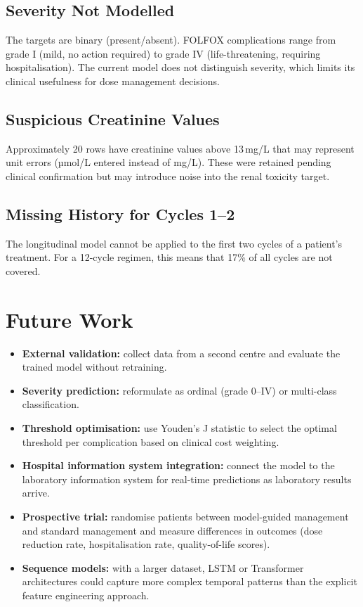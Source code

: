 \documentclass[12pt,a4paper]{report}
\begin{document}
\subsection{Severity Not Modelled}
The targets are binary (present/absent). FOLFOX complications range from grade I (mild, no action required) to grade IV (life-threatening, requiring hospitalisation). The current model does not distinguish severity, which limits its clinical usefulness for dose management decisions.

\subsection{Suspicious Creatinine Values}
Approximately 20 rows have creatinine values above 13\,mg/L that may represent unit errors (µmol/L entered instead of mg/L). These were retained pending clinical confirmation but may introduce noise into the renal toxicity target.

\subsection{Missing History for Cycles 1--2}
The longitudinal model cannot be applied to the first two cycles of a patient's treatment. For a 12-cycle regimen, this means that 17\% of all cycles are not covered.

\section{Future Work}

\begin{itemize}
  \item \textbf{External validation:} collect data from a second centre and evaluate the trained model without retraining.
  \item \textbf{Severity prediction:} reformulate as ordinal (grade 0--IV) or multi-class classification.
  \item \textbf{Threshold optimisation:} use Youden's J statistic to select the optimal threshold per complication based on clinical cost weighting.
  \item \textbf{Hospital information system integration:} connect the model to the laboratory information system for real-time predictions as laboratory results arrive.
  \item \textbf{Prospective trial:} randomise patients between model-guided management and standard management and measure differences in outcomes (dose reduction rate, hospitalisation rate, quality-of-life scores).
  \item \textbf{Sequence models:} with a larger dataset, LSTM or Transformer architectures could capture more complex temporal patterns than the explicit feature engineering approach.
\end{itemize}
\end{document}
